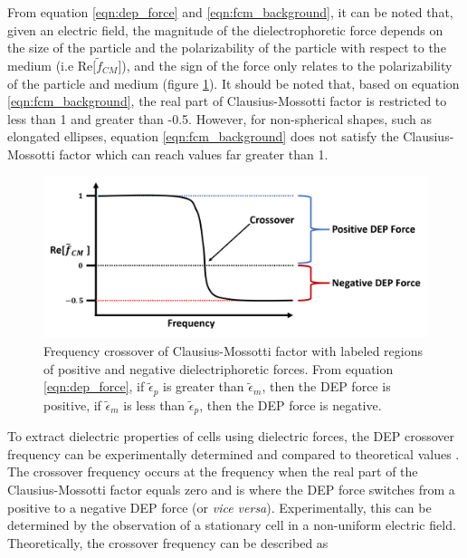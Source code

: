 \par From equation \ref{eqn:dep_force} and \ref{eqn:fcm_background}, it can be noted that, given an electric field, the magnitude of the dielectrophoretic force depends on the size of the particle and the polarizability of the particle with respect to the medium (i.e Re$\big[\tilde{f}_{CM}\big]$), and the sign of the force only relates to the polarizability of the particle and medium (figure \ref{fig:freq_crossover}). It should be noted that, based on equation \ref{eqn:fcm_background}, the real part of Clausius-Mossotti factor is restricted to less than 1 and greater than -0.5. However, for non-spherical shapes, such as elongated ellipses, equation \ref{eqn:fcm_background} does not satisfy the Clausius-Mossotti factor which can reach values far greater than 1.  


\begin{figure}[ht]
 \centering
 \includegraphics[width=\textwidth]{images/DEPCrossover.png}
 \caption[Frequency crossover of Clausius-Mossotti factor] {Frequency crossover of Clausius-Mossotti factor with labeled regions of positive and negative dielectriphoretic forces. From equation \ref{eqn:dep_force}, if $\tilde{\epsilon}_p$ is greater than $\tilde{\epsilon}_m$, then the DEP force is positive, if $\tilde{\epsilon}_m$ is less than $\tilde{\epsilon}_p$, then the DEP force is negative.}
 \label{fig:freq_crossover}
\end{figure}
 
 \par To extract dielectric properties of cells using dielectric forces, the DEP crossover frequency can be experimentally determined and compared to theoretical values \cite{morgan_single_2007}. The crossover frequency occurs at the frequency when the real part of the Clausius-Mossotti factor equals zero and is where the DEP force switches from a positive to a negative DEP force (or \textit{vice versa}). Experimentally, this can be determined by the observation of a stationary cell in a non-uniform electric field. Theoretically, the crossover frequency can be described as
 
